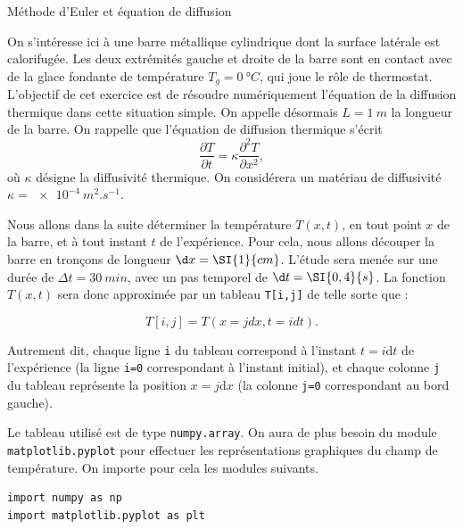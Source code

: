 \begin{exo}[PC][1][devoir]{Méthode d'Euler et équation de diffusion}
\setcounter{subsection}{0}

On s'intéresse ici à une barre métallique cylindrique dont la surface latérale est calorifugée. Les deux extrémités gauche et droite de la barre sont en contact avec de la glace fondante de température $T_g = \SI{0}{\degree C}$, qui joue le rôle de thermostat.  L’objectif de cet exercice est de résoudre numériquement l’équation de la diffusion thermique dans cette situation simple. On appelle désormais $L=\SI{1}{m}$ la longueur de la barre. On rappelle que l'équation de diffusion thermique s'écrit
$$
\frac{\partial T}{\partial t} = \kappa \frac{\partial^2 T}{\partial x^2},
$$
où $\kappa$ désigne la diffusivité thermique. On considérera un matériau de diffusivité $\kappa=\SI{e-4}{m^2.s^{-1}}$.




Nous allons dans la suite déterminer la température $T(x,t)$, en tout point $x$ de la barre,
 et à tout instant $t$ de l'expérience. Pour cela, nous allons découper la barre en tronçons de longueur $\d x=\SI{1}{cm}$.
L'étude sera menée sur une durée de $\Delta t = \SI{30}{min}$, avec un pas temporel de $\d t=\SI{0,4}{s}$. La fonction $T(x,t)$ sera donc approximée par un tableau \texttt{T[i,j]} de telle sorte que :

$$T[i,j] = T(x=j dx,t=i dt).$$

Autrement dit, chaque ligne \texttt{i} du tableau correspond à l'instant $t=i\mathrm{d}t$ de l'expérience (la ligne \texttt{i=0} correspondant à l'instant initial), et chaque colonne \texttt{j} du tableau représente la position $x=j\mathrm{d}x$ (la colonne \texttt{j=0} correspondant au bord gauche).

Le tableau utilisé est de type \texttt{numpy.array}. On aura de plus besoin du module \texttt{matplotlib.pyplot} pour effectuer les représentations graphiques du champ de température. On importe pour cela les modules suivants. 
\begin{verbatim}
import numpy as np
import matplotlib.pyplot as plt
\end{verbatim}


\end{exo}
